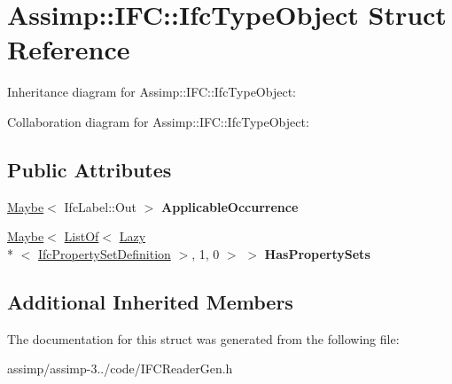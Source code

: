 \hypertarget{struct_assimp_1_1_i_f_c_1_1_ifc_type_object}{\section{Assimp\+:\+:I\+F\+C\+:\+:Ifc\+Type\+Object Struct Reference}
\label{struct_assimp_1_1_i_f_c_1_1_ifc_type_object}
}


Inheritance diagram for Assimp\+:\+:I\+F\+C\+:\+:Ifc\+Type\+Object\+:


Collaboration diagram for Assimp\+:\+:I\+F\+C\+:\+:Ifc\+Type\+Object\+:
\subsection*{Public Attributes}
\begin{DoxyCompactItemize}
\item 
\hypertarget{struct_assimp_1_1_i_f_c_1_1_ifc_type_object_a3ccece85bdbe45951f1e3c5e4a6f6519}{\hyperlink{struct_assimp_1_1_s_t_e_p_1_1_maybe}{Maybe}$<$ Ifc\+Label\+::\+Out $>$ {\bfseries Applicable\+Occurrence}}\label{struct_assimp_1_1_i_f_c_1_1_ifc_type_object_a3ccece85bdbe45951f1e3c5e4a6f6519}

\item 
\hypertarget{struct_assimp_1_1_i_f_c_1_1_ifc_type_object_a8cecfadc835055463526454532a61d0d}{\hyperlink{struct_assimp_1_1_s_t_e_p_1_1_maybe}{Maybe}$<$ \hyperlink{struct_assimp_1_1_s_t_e_p_1_1_list_of}{List\+Of}$<$ \hyperlink{struct_assimp_1_1_s_t_e_p_1_1_lazy}{Lazy}\\*
$<$ \hyperlink{struct_assimp_1_1_i_f_c_1_1_ifc_property_set_definition}{Ifc\+Property\+Set\+Definition} $>$, 1, 0 $>$ $>$ {\bfseries Has\+Property\+Sets}}\label{struct_assimp_1_1_i_f_c_1_1_ifc_type_object_a8cecfadc835055463526454532a61d0d}

\end{DoxyCompactItemize}
\subsection*{Additional Inherited Members}


The documentation for this struct was generated from the following file\+:\begin{DoxyCompactItemize}
\item 
assimp/assimp-\/3../code/I\+F\+C\+Reader\+Gen.\+h\end{DoxyCompactItemize}
